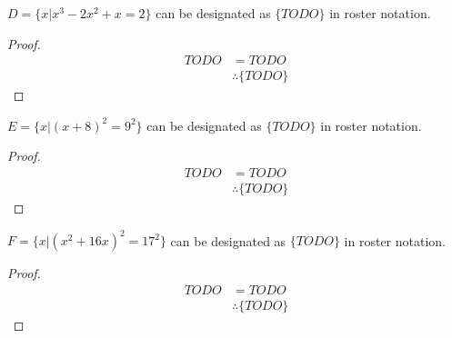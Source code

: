 \begin{enumerate}
  \begin{proposition}
    $D = \{x | x^3 - 2x^2 + x = 2\}$ can be designated as $\{TODO\}$ in roster notation.
  \end{proposition}
  \begin{proof}
    \begin{equation}
      \begin{split}
        TODO & = TODO \\
        & \therefore \{TODO\}
      \end{split}
    \end{equation}
  \end{proof}

  \begin{proposition}
    $E = \{x | (x + 8)^2 = 9^2 \}$ can be designated as $\{TODO\}$ in roster notation.
  \end{proposition}
  \begin{proof}
    \begin{equation}
      \begin{split}
        TODO & = TODO \\
        & \therefore \{TODO\}
      \end{split}
    \end{equation}
  \end{proof}

  \begin{proposition}
    $F = \{x | (x^2 + 16x)^2 = 17^2 \}$ can be designated as $\{TODO\}$ in roster notation.
  \end{proposition}
  \begin{proof}
    \begin{equation}
      \begin{split}
        TODO & = TODO \\
        & \therefore \{TODO\}
      \end{split}
    \end{equation}
  \end{proof}

   
    

    

\end{enumerate}
